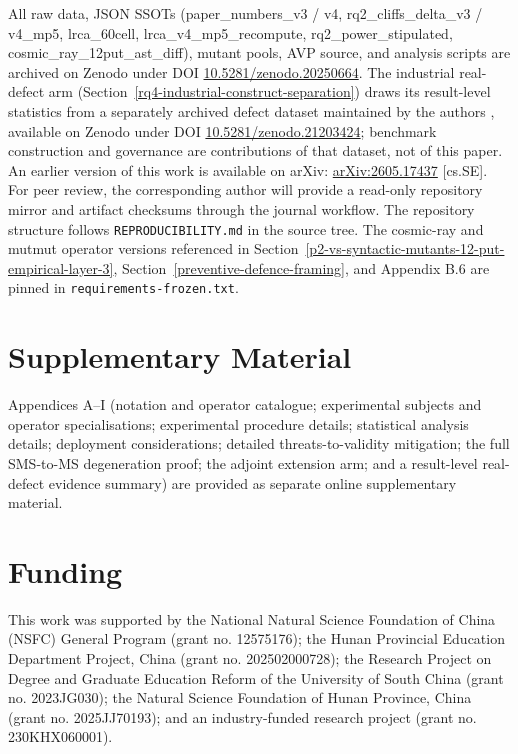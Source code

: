 \documentclass[manuscript,screen,review]{acmart}
\begin{document}
All raw data, JSON SSOTs (paper\_numbers\_v3 / v4,
rq2\_cliffs\_delta\_v3 / v4\_mp5, lrca\_60cell,
lrca\_v4\_mp5\_recompute, rq2\_power\_stipulated,
cosmic\_ray\_12put\_ast\_diff), mutant pools, AVP source, and analysis
scripts are archived on Zenodo under DOI
\href{https://doi.org/10.5281/zenodo.20250664}{10.5281/zenodo.20250664}.
The industrial real-defect arm (Section~\ref{rq4-industrial-construct-separation}) draws its result-level
statistics from a separately archived defect dataset maintained by the
authors \citep{defect4mr2026}, available on Zenodo under DOI
\href{https://doi.org/10.5281/zenodo.21203424}{10.5281/zenodo.21203424};
benchmark construction and governance are contributions of that dataset,
not of this paper.
An earlier version of this work is available on arXiv:
\href{https://arxiv.org/abs/2605.17437}{arXiv:2605.17437} [cs.SE].
For peer review, the corresponding author will provide a read-only
repository mirror and artifact checksums through the journal workflow.
The repository structure follows
\texttt{REPRODUCIBILITY.md} in the source tree. The cosmic-ray and
mutmut operator versions referenced in Section~\ref{p2-vs-syntactic-mutants-12-put-empirical-layer-3}, Section~\ref{preventive-defence-framing}, and Appendix B.6 are
pinned in \texttt{requirements-frozen.txt}.



\section*{Supplementary Material}

Appendices A--I (notation and operator catalogue; experimental subjects and
operator specialisations; experimental procedure details; statistical analysis
details; deployment considerations; detailed threats-to-validity mitigation;
the full SMS-to-MS degeneration proof; the adjoint extension arm; and a
result-level real-defect evidence summary) are provided as separate online
supplementary material.

\section*{Funding}

This work was supported by the National Natural Science Foundation of China
(NSFC) General Program (grant no. 12575176); the Hunan Provincial Education
Department Project, China (grant no. 202502000728); the Research Project on
Degree and Graduate Education Reform of the University of South China (grant
no. 2023JG030); the Natural Science Foundation of Hunan Province, China (grant
no. 2025JJ70193); and an industry-funded research project (grant no.
230KHX060001).
\end{document}
